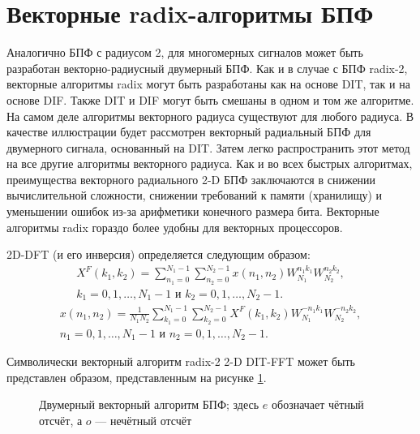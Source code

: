 \section{Векторные radix-алгоритмы БПФ}
Аналогично БПФ с радиусом 2, для многомерных сигналов может быть разработан векторно-радиусный двумерный БПФ.
Как и в случае с БПФ radix-2, векторные алгоритмы radix могут быть разработаны как на основе DIT, так и на основе DIF.
Также DIT и DIF могут быть смешаны в одном и том же алгоритме.
На самом деле алгоритмы векторного радиуса существуют для любого радиуса.
В качестве иллюстрации будет рассмотрен векторный радиальный БПФ для двумерного сигнала, основанный на DIT.
Затем легко распространить этот метод на все другие алгоритмы векторного радиуса.
Как и во всех быстрых алгоритмах, преимущества векторного радиального 2-D БПФ заключаются в снижении вычислительной сложности, снижении требований к памяти (хранилищу) и уменьшении ошибок из-за арифметики конечного размера бита.
Векторные алгоритмы radix гораздо более удобны для векторных процессоров.

2D-DFT (и его инверсия) определяется следующим образом:
\begin{equation}\label{eq: 2d fft fwd}\begin{gathered}
X^F(k_1, k_2) = \sum_{n_1=0}^{N_1-1} \sum_{n_2=0}^{N_2-1} x(n_1, n_2) W_{N_1}^{n_1 k_1} W_{N_2}^{n_2 k_2}, \\
k_1 = 0, 1, \dots, N_1 - 1 \text{ и } k_2 = 0, 1, \dots, N_2 - 1.
\end{gathered}\end{equation}
\begin{equation}\label{eq: 2d fft inv}\begin{gathered}
x(n_1, n_2) = \frac{1}{N_1 N_2} \sum_{k_1=0}^{N_1-1} \sum_{k_2=0}^{N_2-1} X^F(k_1, k_2) W_{N_1}^{-n_1 k_1} W_{N_2}^{-n_2 k_2}, \\
n_1 = 0, 1, \dots, N_1 - 1 \text{ и } n_2 = 0, 1, \dots, N_2 - 1.
\end{gathered}\end{equation}

Символически векторный алгоритм radix-2 2-D DIT-FFT может быть представлен образом, представленным на рисунке \ref{figure: 2d vector fft}.
\begin{figure}[ht]
\centering
\caption{Двумерный векторный алгоритм БПФ; здесь $e$ обозначает чётный отсчёт, а $o$ --- нечётный отсчёт}
\label{figure: 2d vector fft}
\end{figure}

